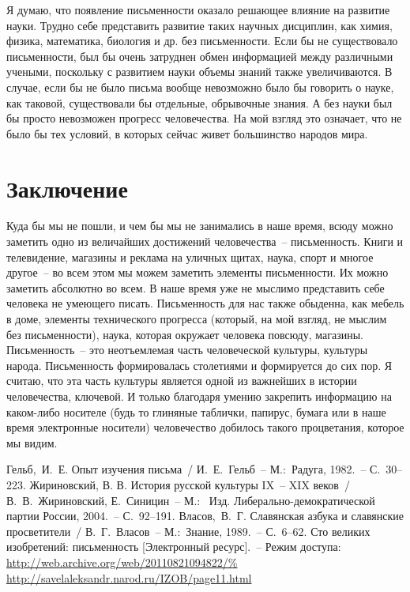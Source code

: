   Я думаю, что появление письменности оказало решающее влияние на развитие
  науки. Трудно себе представить развитие таких научных дисциплин, как химия,
  физика, математика, биология и др. без письменности. Если бы не существовало
  письменности, был бы очень затруднен обмен информацией между различными
  учеными, поскольку с развитием науки объемы знаний также увеличиваются. В
  случае, если бы не было письма вообще невозможно было бы говорить о науке,
  как таковой, существовали бы отдельные, обрывочные знания. А без науки был бы
  просто невозможен прогресс человечества. На мой взгляд это означает, что не
  было бы тех условий, в которых сейчас живет большинство народов мира.
    
  \section*{Заключение}
  Куда бы мы не пошли, и чем бы мы не занимались в наше время, всюду можно
  заметить одно из величайших достижений человечества~-- письменность. Книги и
  телевидение, магазины и реклама на уличных щитах, наука, спорт и многое
  другое~-- во всем этом мы можем заметить элементы письменности. Их можно
  заметить абсолютно во всем. В наше время уже не мыслимо представить себе
  человека не умеющего писать. Письменность для нас также обыденна, как мебель
  в доме, элементы технического прогресса (который, на мой взгляд, не мыслим
  без письменности), наука, которая окружает человека повсюду, магазины.
  Письменность~-- это неотъемлемая часть человеческой культуры, культуры
  народа. Письменность формировалась столетиями и формируется до сих пор. Я
  считаю, что эта часть   культуры является одной из важнейших в истории
  человечества, ключевой. И только благодаря умению закрепить информацию на
  каком-либо носителе (будь то глиняные таблички, папирус, бумага или в наше
  время электронные носители) человечество добилось такого процветания, которое
  мы видим.
  
  \newpage

  \renewcommand{\bibname}{Список использованной литературы}
  \begin{thebibliography}{9}
       Гельб,~И.~Е. Опыт изучения письма~/ И.~Е.~Гельб~--
        М.:~Радуга, 1982.~-- С.~30--223.
       Жириновский, В. В. История русской культуры
        IX~-- XIX веков~/ В.~В.~Жириновский, Е.~Синицин~-- М.:~ Изд.
        Либерально-демократической партии России, 2004.~-- С.~92--191.
       Власов,~В.~Г. Славянская азбука и славянские
        просветители~/ В.~Г.~Власов~-- М.:~Знание, 1989.~-- С.~6--62.
       Сто великих изобретений: письменность
      [Электронный ресурс].~-- Режим доступа:\\
      \url{http://web.archive.org/web/20110821094822/%
        http://savelaleksandr.narod.ru/IZOB/page11.html}
  \end{thebibliography}


